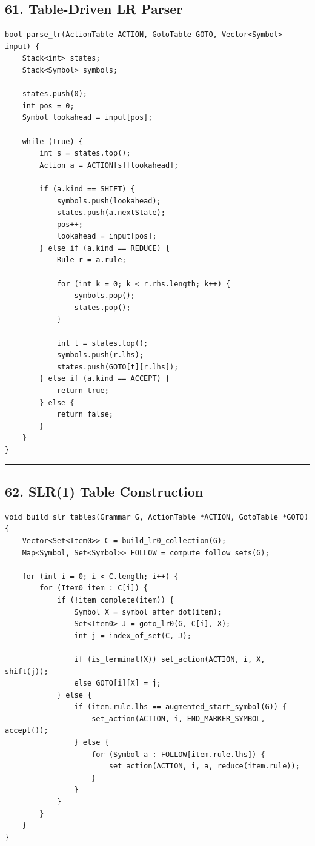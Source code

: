 \documentclass[10pt,letterpaper]{article}
\begin{document}
\subsection*{61. Table-Driven LR Parser}

\begin{verbatim}
bool parse_lr(ActionTable ACTION, GotoTable GOTO, Vector<Symbol> input) {
    Stack<int> states;
    Stack<Symbol> symbols;

    states.push(0);
    int pos = 0;
    Symbol lookahead = input[pos];

    while (true) {
        int s = states.top();
        Action a = ACTION[s][lookahead];

        if (a.kind == SHIFT) {
            symbols.push(lookahead);
            states.push(a.nextState);
            pos++;
            lookahead = input[pos];
        } else if (a.kind == REDUCE) {
            Rule r = a.rule;

            for (int k = 0; k < r.rhs.length; k++) {
                symbols.pop();
                states.pop();
            }

            int t = states.top();
            symbols.push(r.lhs);
            states.push(GOTO[t][r.lhs]);
        } else if (a.kind == ACCEPT) {
            return true;
        } else {
            return false;
        }
    }
}
\end{verbatim}

\medskip\hrule\medskip

\subsection*{62. SLR(1) Table Construction}

\begin{verbatim}
void build_slr_tables(Grammar G, ActionTable *ACTION, GotoTable *GOTO) {
    Vector<Set<Item0>> C = build_lr0_collection(G);
    Map<Symbol, Set<Symbol>> FOLLOW = compute_follow_sets(G);

    for (int i = 0; i < C.length; i++) {
        for (Item0 item : C[i]) {
            if (!item_complete(item)) {
                Symbol X = symbol_after_dot(item);
                Set<Item0> J = goto_lr0(G, C[i], X);
                int j = index_of_set(C, J);

                if (is_terminal(X)) set_action(ACTION, i, X, shift(j));
                else GOTO[i][X] = j;
            } else {
                if (item.rule.lhs == augmented_start_symbol(G)) {
                    set_action(ACTION, i, END_MARKER_SYMBOL, accept());
                } else {
                    for (Symbol a : FOLLOW[item.rule.lhs]) {
                        set_action(ACTION, i, a, reduce(item.rule));
                    }
                }
            }
        }
    }
}
\end{verbatim}
\end{document}
